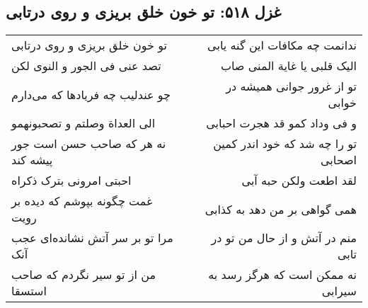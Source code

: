 \begin{center}
\section*{غزل ۵۱۸: تو خون خلق بریزی و روی درتابی}
\label{sec:518}
\begin{longtable}{l p{0.5cm} r}
تو خون خلق بریزی و روی درتابی
&&
ندانمت چه مکافات این گنه یابی
\\
تصد عنی فی الجور و النوی لکن
&&
الیک قلبی یا غایة المنی صاب
\\
چو عندلیب چه فریادها که می‌دارم
&&
تو از غرور جوانی همیشه در خوابی
\\
الی العداة وصلتم و تصحبونهمو
&&
و فی وداد کمو قد هجرت احبابی
\\
نه هر که صاحب حسن است جور پیشه کند
&&
تو را چه شد که خود اندر کمین اصحابی
\\
احبتی امرونی بترک ذکراه
&&
لقد اطعت ولکن حبه آبی
\\
غمت چگونه بپوشم که دیده بر رویت
&&
همی گواهی بر من دهد به کذابی
\\
مرا تو بر سر آتش نشانده‌ای عجب آنک
&&
منم در آتش و از حال من تو در تابی
\\
من از تو سیر نگردم که صاحب استسقا
&&
نه ممکن است که هرگز رسد به سیرابی
\\
\end{longtable}
\end{center}
